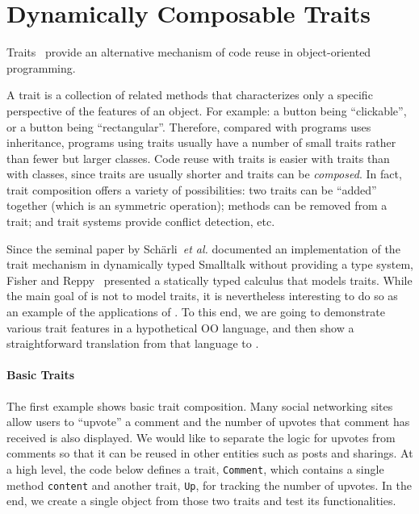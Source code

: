 \section{Dynamically Composable Traits}

Traits~\cite{scharli2003traits} provide an alternative mechanism of code reuse
in object-oriented programming.

A trait is a collection of related methods that characterizes only a specific
perspective of the features of an object. For example: a button being
``clickable'', or a button being ``rectangular''. Therefore, compared with
programs uses inheritance, programs using traits usually have a number of small
traits rather than fewer but larger classes. Code reuse with traits is easier
with traits than with classes, since traits are usually shorter and traits can
be \emph{composed}. In fact, trait composition offers a variety of
possibilities: two traits can be ``added'' together (which is an symmetric
operation); methods can be removed from a trait; and trait systems provide
conflict detection, etc.

Since the seminal paper by Schärli~\emph{et al.} documented an implementation of
the trait mechanism in dynamically typed Smalltalk without providing a type
system, Fisher and Reppy~\cite{fisher2004typed} presented a statically typed
calculus that models traits. While the main goal of \name is not to model
traits, it is nevertheless interesting to do so as an example of the
applications of \name. To this end, we are going to demonstrate various trait
features in a hypothetical OO language, and then show a straightforward
translation from that language to \name. 

\paragraph{Basic Traits}


The first example shows basic trait composition. Many social networking sites
allow users to ``upvote'' a comment and the number of upvotes that comment has
received is also displayed. We would like to separate the logic for upvotes from
comments so that it can be reused in other entities such as posts and sharings.
At a high level, the code below defines a trait, \lstinline$Comment$, which
contains a single method \lstinline$content$ and another trait, \lstinline$Up$,
for tracking the number of upvotes. In the end, we create a single object from
those two traits and test its functionalities.


